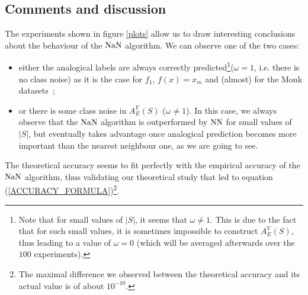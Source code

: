 {\subsection{Comments and discussion}

The experiments shown in figure \ref{plots} allow us to draw interesting
conclusions about the behaviour of the $\mbox{NaN}$ algorithm.  We can observe one of
the two cases:
\begin{itemize}
  \item either the analogical labels are always correctly
    predicted\footnote{Note that for small values of $|S|$, it seems that
      $\omega \neq 1$. This is due to the fact that for such small values, it
      is sometimes impossible to construct $A_E^Y(S)$, thus leading to a value
      of $\omega = 0$ (which will be averaged afterwards over the $100$
    experiments).}($\omega = 1$, i.e. there is no class noise) as it is the case for  $f_1$, $f(x) = x_m$ and
    (almost) for the Monk datasets~;
    \item or there is some class noise in $A_E^Y(S)$ ($\omega \neq 1$). In this
      case, we always observe that the $\mbox{NaN}$ algorithm is outperformed by
      $\mbox{NN}$ for small values of $|S|$, but eventually takes advantage once
      analogical prediction becomes more important than the nearest neighbour
      one, as we are going to see.
\end{itemize}

The theoretical accuracy seems to fit perfectly with the empirical accuracy of
the $\mbox{NaN}$ algorithm, thus validating our theoretical study that led to
equation (\ref{ACCURACY_FORMULA})\footnote{The maximal difference we observed between the
theoretical accuracy and its actual value is of about $10^{-10}$.}.

}
